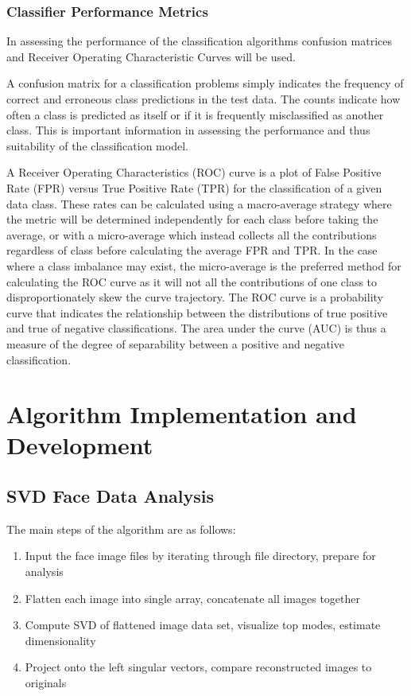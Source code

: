 \documentclass{article}
\begin{document}
\subsubsection{Classifier Performance Metrics}\label{classIntro}
In assessing the performance of the classification algorithms confusion matrices and Receiver Operating Characteristic Curves will be used.

A confusion matrix for a classification problems simply indicates the frequency of correct and erroneous class predictions in the test data. The counts indicate how often a class is predicted as itself or if it is frequently misclassified as another class. This is important information in assessing the performance and thus suitability of the classification model.

A Receiver Operating Characteristics (ROC) curve is a plot of False Positive Rate (FPR) versus True Positive Rate (TPR) for the classification of a given data class. These rates can be calculated using a macro-average strategy where the metric will be determined independently for each class before taking the average, or with a micro-average which instead collects all the contributions regardless of class before calculating the average FPR and TPR. In the case where a class imbalance may exist, the micro-average is the preferred method for calculating the ROC curve as it will not all the contributions of one class to disproportionately skew the curve trajectory. The ROC curve is a probability curve that indicates the relationship between the distributions of true positive and true of negative classifications. The area under the curve (AUC) is thus a measure of the degree of separability between a positive and negative classification.

\section{Algorithm Implementation and Development}
\subsection{SVD Face Data Analysis}
The main steps of the algorithm are as follows: 
\begin{enumerate}
    \item Input the face image files by iterating through file directory, prepare for analysis
    \item Flatten each image into single array, concatenate all images together
    \item Compute SVD of flattened image data set, visualize top modes, estimate dimensionality
    \item Project onto the left singular vectors, compare reconstructed images to originals
\end{enumerate}
\end{document}

